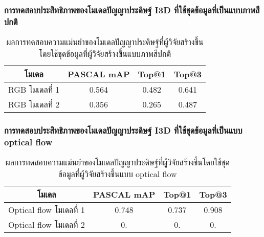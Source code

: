 \subsubsection{การทดสอบประสิทธิภาพของโมเดลปัญญาประดิษฐ์ I3D ที่ใช้ชุดข้อมูลที่เป็นแบบภาพสีปกติ}
\begin{table}[!ht]
	\centering
	\begin{tabular}{|c|c|c|c|}
			\hline
			{โมเดล}	&	{PASCAL mAP}	&	{Top@1}	&	{Top@3}\\
			\hline
			RGB โมเดลที่ 1	& 0.564	& 0.482	& 0.641	\\
			RGB โมเดลที่ 2	& 0.356	& 0.265	& 0.487	\\
			\hline
	\end{tabular}
\caption{ผลการทดสอบความแม่นยำของโมเดลปัญญาประดิษฐ์ที่ผู้วิจัยสร้างขึ้นโดยใช้ชุดข้อมูลที่ผู้วิจัยสร้างขึ้นแบบภาพสีปกติ}
\label{tab:I3D_RGB_performance}
\end{table}


\subsubsection{การทดสอบประสิทธิภาพของโมเดลปัญญาประดิษฐ์ I3D ที่ใช้ชุดข้อมูลที่เป็นแบบ optical flow}
\begin{table}[!ht]
	\centering
	\begin{tabular}{|c|c|c|c|}
			\hline
			{โมเดล}	&	{PASCAL mAP}	&	{Top@1}	&	{Top@3}\\
			\hline
			Optical flow โมเดลที่ 1	& 0.748	& 0.737	& 0.908	\\
			Optical flow โมเดลที่ 2	& 0.	& 0.	& 0.	\\
			\hline
	\end{tabular}
\caption{ผลการทดสอบความแม่นยำของโมเดลปัญญาประดิษฐ์ที่ผู้วิจัยสร้างขึ้นโดยใช้ชุดข้อมูลที่ผู้วิจัยสร้างขึ้นแบบ optical flow}
\label{tab:I3D_OP_performance}
\end{table}


